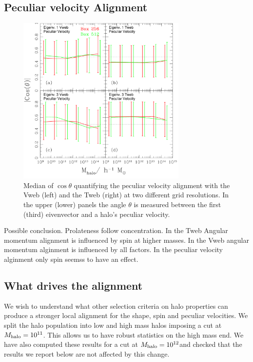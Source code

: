 \documentclass[useAMS,usenatbib]{mn2e}
\newcommand{\hMsun}{{\ifmmode{h^{-1}{\rm
        {M_{\odot}}}}\else{$h^{-1}{\rm{M_{\odot}}}$}\fi}}
\begin{document}
\subsection{Peculiar velocity Alignment}

\begin{figure}
\includegraphics[width=0.75\textwidth]{Fig4.pdf}
\caption{Median of $\cos\theta$ quantifying the peculiar velocity
  alignment with the Vweb (left) and the Tweb (right) at two different
  grid resolutions. In the upper (lower)  panels the angle $\theta$ is
  measured between the first (third) eivenvector and a halo's peculiar
  velocity.} 
\end{figure}

Possible conclusion. Prolateness follow concentration. In the Tweb
Angular momentum alignment is influenced by spin at higher masses. In
the Vweb angular momentum alginment is influenced by all factors. In
the peculiar velocity alginment only spin seemss to have an effect. 

\subsection{What drives the alignment}

We wish to understand what other selection criteria on halo
properties can produce a stronger local alignment for the shape, spin
and peculiar velocities. We split the halo population into low and
high mass halos imposing a cut at $M_{\rm halo}=10^{11}$\hMsun. This
allows us to have robust statistics on the high mass end. We have also
computed these results for a cut at $M_{\rm halo}=10^{12}$\hMsun and
checked that the results we report below are not affected by this
change.
\end{document}
